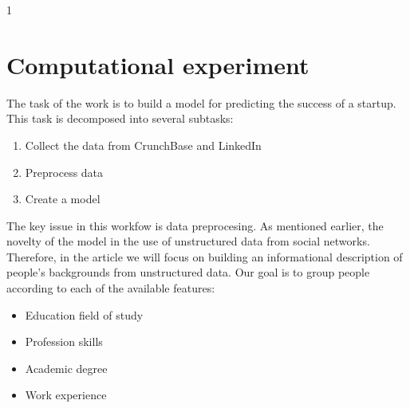 \documentclass[twoside,twocolumn,12pt]{article}
\theoremstyle{plain}
\theoremstyle{definition}
\begin{document}



1

\section{Computational experiment}

The task of the work is to build a model for predicting the success of a startup. This task is decomposed into several subtasks:

\begin{enumerate}
    \item Collect the data from CrunchBase and LinkedIn
    \item Preprocess data
    \item Create a model
\end{enumerate}

The key issue in this workfow is data preprocesing. As mentioned earlier, the novelty of the model in the use of unstructured data from social networks. Therefore, in the article we will focus on building an informational description of people's backgrounds from unstructured data. Our goal is to group people according to each of the available features:

\begin{itemize}
    \item Education field of study
    \item Profession skills
    \item Academic degree
    \item Work experience
\end{itemize}
\end{document}
